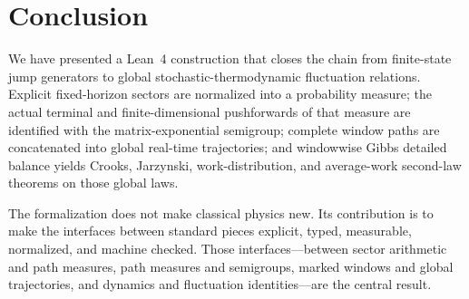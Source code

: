 \section{Conclusion}

We have presented a Lean~4 construction that closes the chain from finite-state jump generators to global stochastic-thermodynamic fluctuation relations. Explicit fixed-horizon sectors are normalized into a probability measure; the actual terminal and finite-dimensional pushforwards of that measure are identified with the matrix-exponential semigroup; complete window paths are concatenated into global real-time trajectories; and windowwise Gibbs detailed balance yields Crooks, Jarzynski, work-distribution, and average-work second-law theorems on those global laws.

The formalization does not make classical physics new. Its contribution is to make the interfaces between standard pieces explicit, typed, measurable, normalized, and machine checked. Those interfaces---between sector arithmetic and path measures, path measures and semigroups, marked windows and global trajectories, and dynamics and fluctuation identities---are the central result.

